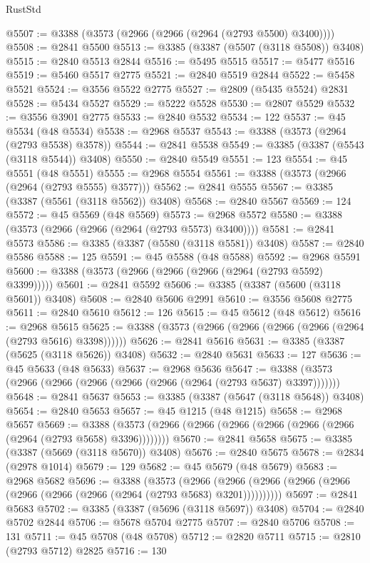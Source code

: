 \begin{lexlean}{RustStd}
\begin{coremodule}
@5507 := @3388 (@3573 (@2966 (@2966 (@2964 (@2793 @5500) @3400))))
@5508 := @2841 @5500
@5513 := @3385 (@3387 (@5507 (@3118 @5508)) @3408)
@5515 := @2840 @5513 @2844
@5516 := @5495 @5515
@5517 := @5477 @5516
@5519 := @5460 @5517 @2775
@5521 := @2840 @5519 @2844
@5522 := @5458 @5521
@5524 := @3556 @5522 @2775
@5527 := @2809 (@5435 @5524) @2831
@5528 := @5434 @5527
@5529 := @5222 @5528
@5530 := @2807 @5529
@5532 := @3556 @3901 @2775
@5533 := @2840 @5532
@5534 := 122
@5537 := @45 @5534 (@48 @5534)
@5538 := @2968 @5537
@5543 := @3388 (@3573 (@2964 (@2793 @5538) @3578))
@5544 := @2841 @5538
@5549 := @3385 (@3387 (@5543 (@3118 @5544)) @3408)
@5550 := @2840 @5549
@5551 := 123
@5554 := @45 @5551 (@48 @5551)
@5555 := @2968 @5554
@5561 := @3388 (@3573 (@2966 (@2964 (@2793 @5555) @3577)))
@5562 := @2841 @5555
@5567 := @3385 (@3387 (@5561 (@3118 @5562)) @3408)
@5568 := @2840 @5567
@5569 := 124
@5572 := @45 @5569 (@48 @5569)
@5573 := @2968 @5572
@5580 := @3388 (@3573 (@2966 (@2966 (@2964 (@2793 @5573) @3400))))
@5581 := @2841 @5573
@5586 := @3385 (@3387 (@5580 (@3118 @5581)) @3408)
@5587 := @2840 @5586
@5588 := 125
@5591 := @45 @5588 (@48 @5588)
@5592 := @2968 @5591
@5600 := @3388 (@3573 (@2966 (@2966 (@2966 (@2964 (@2793 @5592) @3399)))))
@5601 := @2841 @5592
@5606 := @3385 (@3387 (@5600 (@3118 @5601)) @3408)
@5608 := @2840 @5606 @2991
@5610 := @3556 @5608 @2775
@5611 := @2840 @5610
@5612 := 126
@5615 := @45 @5612 (@48 @5612)
@5616 := @2968 @5615
@5625 := @3388 (@3573 (@2966 (@2966 (@2966 (@2966 (@2964 (@2793 @5616) @3398))))))
@5626 := @2841 @5616
@5631 := @3385 (@3387 (@5625 (@3118 @5626)) @3408)
@5632 := @2840 @5631
@5633 := 127
@5636 := @45 @5633 (@48 @5633)
@5637 := @2968 @5636
@5647 := @3388 (@3573 (@2966 (@2966 (@2966 (@2966 (@2966 (@2964 (@2793 @5637) @3397)))))))
@5648 := @2841 @5637
@5653 := @3385 (@3387 (@5647 (@3118 @5648)) @3408)
@5654 := @2840 @5653
@5657 := @45 @1215 (@48 @1215)
@5658 := @2968 @5657
@5669 := @3388 (@3573 (@2966 (@2966 (@2966 (@2966 (@2966 (@2966 (@2964 (@2793 @5658) @3396))))))))
@5670 := @2841 @5658
@5675 := @3385 (@3387 (@5669 (@3118 @5670)) @3408)
@5676 := @2840 @5675
@5678 := @2834 (@2978 @1014)
@5679 := 129
@5682 := @45 @5679 (@48 @5679)
@5683 := @2968 @5682
@5696 := @3388
    (@3573
      (@2966 (@2966 (@2966 (@2966 (@2966 (@2966 (@2966 (@2966 (@2964 (@2793 @5683) @3201))))))))))
@5697 := @2841 @5683
@5702 := @3385 (@3387 (@5696 (@3118 @5697)) @3408)
@5704 := @2840 @5702 @2844
@5706 := @5678 @5704 @2775
@5707 := @2840 @5706
@5708 := 131
@5711 := @45 @5708 (@48 @5708)
@5712 := @2820 @5711
@5715 := @2810 (@2793 @5712) @2825
@5716 := 130

\end{coremodule}
\end{lexlean}
